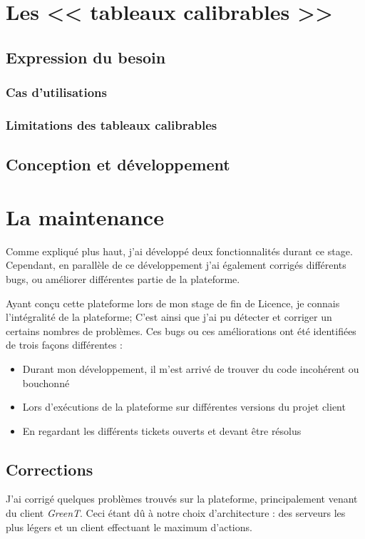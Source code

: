 \section{Les << tableaux calibrables >>}
	\subsection{Expression du besoin}
		\subsubsection{Cas d'utilisations}
		\subsubsection{Limitations des tableaux calibrables}
	\subsection{Conception et développement}

\section{La maintenance}
Comme expliqué plus haut, j'ai développé deux fonctionnalités durant ce stage. Cependant, en parallèle de ce développement j'ai également corrigés différents bugs, ou améliorer différentes partie de la plateforme.

Ayant conçu cette plateforme lors de mon stage de fin de Licence, je connais l'intégralité de la plateforme; C'est ainsi que j'ai pu détecter et corriger un certains nombres de problèmes. Ces bugs ou ces améliorations ont été identifiées de trois façons différentes : 
\begin{itemize}
	\item Durant mon développement, il m'est arrivé de trouver du code incohérent ou bouchonné
	\item Lors d'exécutions de la plateforme sur différentes versions du projet client
	\item En regardant les différents tickets ouverts et devant être résolus
\end{itemize}

\subsection{Corrections}
J'ai corrigé quelques problèmes trouvés sur la plateforme, principalement venant du client \textit{GreenT}. Ceci étant dû à notre choix d'architecture : des serveurs les plus légers et un client effectuant le maximum d'actions.
